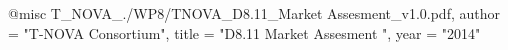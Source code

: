 @misc{ T_NOVA_./WP8/TNOVA_D8.11_Market Assesment_v1.0.pdf,
       author = "T-NOVA Consortium",
       title = "D8.11 Market Assesment ",
       year = "2014" }
